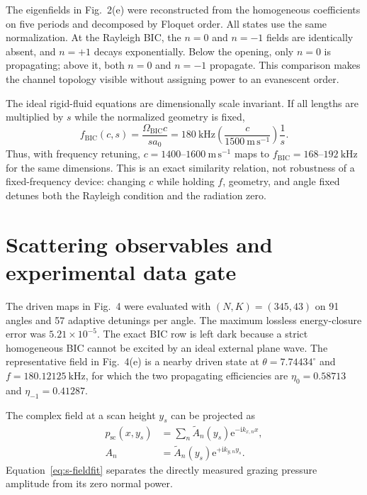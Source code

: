 \documentclass[aps,prl,reprint,superscriptaddress,nofootinbib,floatfix]{revtex4-2}
\newcommand{\ii}{\mathrm{i}}
\newcommand{\e}{\mathrm{e}}
\newcommand{\BIC}{\mathrm{BIC}}
\begin{document}
The eigenfields in Fig.~2(e) were reconstructed from the homogeneous
coefficients on five periods and decomposed by Floquet order.  All states use
the same normalization.  At the Rayleigh BIC, the $n=0$ and $n=-1$ fields are
identically absent, and $n=+1$ decays exponentially.  Below the opening, only
$n=0$ is propagating; above it, both $n=0$ and $n=-1$ propagate.  This
comparison makes the channel topology visible without assigning power to an
evanescent order.

The ideal rigid-fluid equations are dimensionally scale invariant.  If all
lengths are multiplied by $s$ while the normalized geometry is fixed,
\begin{equation}
 f_{\BIC}(c,s)=\frac{\Omega_{\BIC}c}{sa_0}
 =180~\mathrm{kHz}\left(\frac{c}{1500~\mathrm{m\,s^{-1}}}\right)\frac{1}{s}.
 \label{eq:s-scaling}
\end{equation}
Thus, with frequency retuning, $c=1400$--$1600~\mathrm{m\,s^{-1}}$ maps to
$f_{\BIC}=168$--$192~\mathrm{kHz}$ for the same dimensions.  This is an exact
similarity relation, not robustness of a fixed-frequency device: changing
$c$ while holding $f$, geometry, and angle fixed detunes both the Rayleigh
condition and the radiation zero.

\section{Scattering observables and experimental data gate}

The driven maps in Fig.~4 were evaluated with $(N,K)=(345,43)$ on 91 angles
and 57 adaptive detunings per angle.  The maximum lossless energy-closure
error was $5.21\times10^{-5}$.  The exact BIC row is left dark because a
strict homogeneous BIC cannot be excited by an ideal external plane wave.
The representative field in Fig.~4(e) is a nearby driven state at
$\theta=7.74434^{\circ}$ and $f=180.12125~\mathrm{kHz}$, for which the two
propagating efficiencies are $\eta_0=0.58713$ and
$\eta_{-1}=0.41287$.

The complex field at a scan height $y_s$ can be projected as
\begin{equation}
 \begin{aligned}
 p_{\mathrm{sc}}(x,y_s)&=\sum_n\widetilde A_n(y_s)
 \e^{-\ii k_{x,n}x},\\
 A_n&=\widetilde A_n(y_s)\e^{+\ii k_{y,n}y_s}.
 \end{aligned}
 \label{eq:s-fieldfit}
\end{equation}
Equation~\eqref{eq:s-fieldfit} separates the directly measured grazing
pressure amplitude from its zero normal power.
\end{document}
